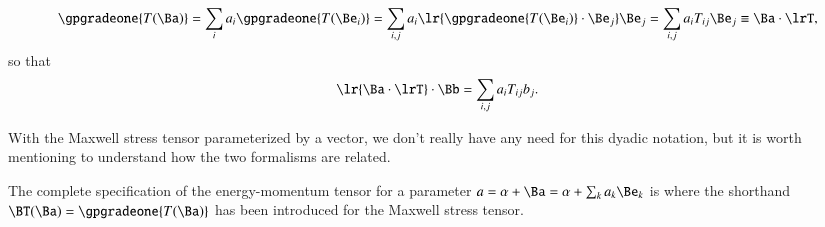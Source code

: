 \begin{dmath}\label{eqn:poyntingF:1140}
\gpgradeone{ T(\Ba) }
=
\sum_i a_i \gpgradeone{ T(\Be_i) }
=
\sum_{i,j} a_i \lr{ \gpgradeone{ T(\Be_i) } \cdot \Be_j } \Be_j
=
\sum_{i,j} a_i T_{ij} \Be_j
\equiv
\Ba \cdot \lrT,
\end{dmath}
so that
\begin{dmath}\label{eqn:poyntingF:1160}
\lr{ \Ba \cdot \lrT } \cdot \Bb
=
\sum_{i,j} a_i T_{ij} b_j.
\end{dmath}

With the Maxwell stress tensor parameterized by a vector, we don't really have any need for this dyadic notation, but it is worth mentioning to
understand how the two formalisms are related.

The complete specification of the energy-momentum tensor for a parameter \( a = \alpha + \Ba = \alpha + \sum_k a_k \Be_k \) is
where the shorthand \( \BT(\Ba) = \gpgradeone{T(\Ba)} \) has been introduced for the Maxwell stress tensor.
